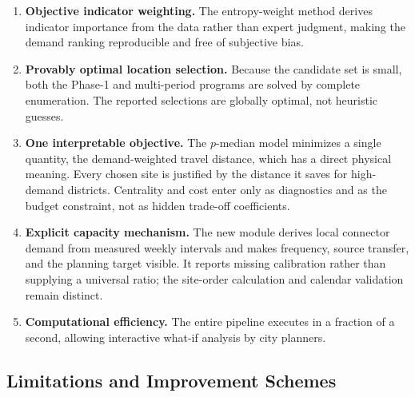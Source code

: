 \documentclass[12pt]{article}
\begin{document}
\begin{enumerate}
    \item \textbf{Objective indicator weighting.} The entropy-weight method derives
    indicator importance from the data rather than expert judgment, making the demand
    ranking reproducible and free of subjective bias.
    \item \textbf{Provably optimal location selection.} Because the candidate set is small,
    both the Phase-1 and multi-period programs are solved by complete enumeration. The
    reported selections are globally optimal, not heuristic guesses.
    \item \textbf{One interpretable objective.} The $p$-median model minimizes a single
    quantity, the demand-weighted travel distance, which has a direct physical meaning. Every
    chosen site is justified by the distance it saves for high-demand districts. Centrality
    and cost enter only as diagnostics and as the budget constraint, not as hidden
    trade-off coefficients.
    \item \textbf{Explicit capacity mechanism.} The new module derives local connector
    demand from measured weekly intervals and makes frequency, source transfer, and the
    planning target visible. It reports missing calibration rather than supplying a
    universal ratio; the site-order calculation and calendar validation remain distinct.
    \item \textbf{Computational efficiency.} The entire pipeline executes in a fraction of
    a second, allowing interactive what-if analysis by city planners.
\end{enumerate}

\subsection{Limitations and Improvement Schemes}
\label{subsec:limitations}
\end{document}
